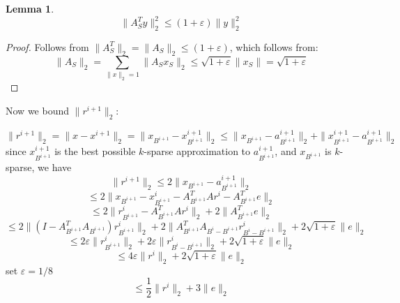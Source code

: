 \documentclass[11pt]{article}
\newtheorem{lemma}[theorem]{Lemma}
\begin{document}
\begin{lemma}
$$\|A^T_S y\|_2^2 \le (1+\varepsilon)\|y\|_2^2$$
\end{lemma}
\begin{proof}
Follows from $\|A_S^T\|_2 = \|A_S\|_2 \le (1+\varepsilon)$, which follows from:
$$\|A_S\|_2 = \sum_{\|x\|_2 = 1} \|A_S x_S\|_2 \le \sqrt{1+\varepsilon} \|x_S\| = \sqrt{1+\varepsilon}$$
\end{proof}


Now we bound $\|r^{i+1}\|_2$:

$$\|r^{i+1}\|_2 = \|x-x^{i+1}\|_2 = \|x_{B^{i+1}} - x^{i+1}_{B^{i+1}}\|_2 \le  \|x_{B^{i+1}} - a^{i+1}_{B^{i+1}}\|_2 + \|x^{i+1}_{B^{i+1}} - a^{i+1}_{B^{i+1}}\|_2$$
since $x^{i+1}_{B^{i+1}}$ is the best possible $k$-sparse approximation to $a^{i+1}_{B^{i+1}}$, and $x_{B^{i+1}}$ is $k$-sparse, we have
$$\|r^{i+1}\|_2 \le 2 \|x_{B^{i+1}} - a^{i+1}_{B^{i+1}}\|_2 $$
$$\le 2\|x_{B^{i+1}} - x^i_{B^{i+1}} - A^T_{B^{i+1}} A r^i  - A^T_{B^{i+1}} e\|_2$$
$$\le 2\|r^i_{B^{i+1}} - A^T_{B^{i+1}} A r^i \|_2 + 2 \|A^T_{B^{i+1}} e\|_2$$
$$\le 2\|(I - A^T_{B^{i+1}}A_{B^{i+1}})r^i_{B^{i+1}}\|_2  + 2 \|A^T_{B^{i+1}} A_{B^i-B^{i+1}} r^i_{B^i-B^{i+1}} \|_2+ 2 \sqrt{1+\varepsilon}\| e\|_2$$
$$\le 2\varepsilon\|r^i_{B^{i+1}}\|_2  + 2 \varepsilon\| r^i_{B^i-B^{i+1}} \|_2 + 2 \sqrt{1+\varepsilon}\| e\|_2$$
$$\le 4\varepsilon\|r^i\|_2 + 2 \sqrt{1+\varepsilon}\| e\|_2$$
set $\varepsilon = 1/8$
$$\le \frac12\|r^i\|_2 + 3\|e\|_2$$



\end{document}
